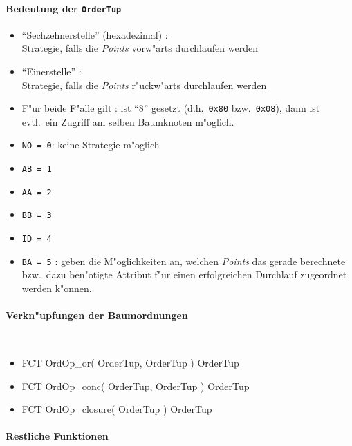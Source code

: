 \paragraph{Bedeutung der {\tt OrderTup}}

\begin{itemize}
\item "`Sechzehnerstelle"' (hexadezimal) :\\
Strategie, falls die {\it Points} vorw"arts durchlaufen werden
\item "`Einerstelle"' :\\
Strategie, falls die {\it Points} r"uckw"arts durchlaufen werden
\item F"ur beide F"alle gilt : ist "`8"' gesetzt (d.h.\ {\tt 0x80} bzw.\ {\tt 0x08}),
dann ist evtl.\ ein Zugriff am selben Baumknoten m"oglich.
\end{itemize}

\begin{itemize}
\item {\tt NO = 0}: keine Strategie m"oglich
\item {\tt AB = 1}
\item {\tt AA = 2}
\item {\tt BB = 3}
\item {\tt ID = 4}
\item {\tt BA = 5} : geben die M"oglichkeiten an, welchen {\it Points}
das gerade berechnete bzw.\ dazu ben"otigte Attribut f"ur einen erfolgreichen
Durchlauf zugeordnet werden k"onnen.
\end{itemize}

\paragraph{Verkn"upfungen der Baumordnungen}
{\tt
\begin{itemize}
\item FCT OrdOp\_or( OrderTup, OrderTup ) OrderTup
\item FCT OrdOp\_conc( OrderTup, OrderTup ) OrderTup
\item FCT OrdOp\_closure( OrderTup ) OrderTup
\end{itemize}
}

\paragraph{Restliche Funktionen}

